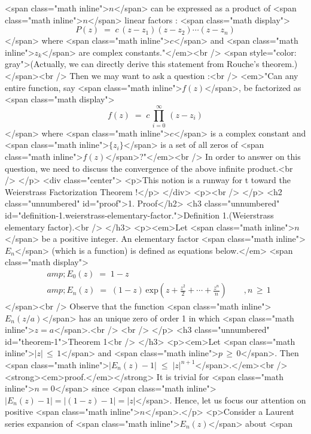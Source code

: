 <span class="math inline">\(n\)</span> can be expressed as a product of
<span class="math inline">\(n\)</span> linear factors : <span
class="math display">\[P(z) \;=\; c\, (z-z_1)(z-z_2)\cdots
(z-z_n)\]</span> where <span class="math inline">\(c\)</span> and <span
class="math inline">\(z_k\)</span> are complex constants."</em><br />
<span style="color: gray">(Actually, we can directly derive this
statement from Rouche’s theorem.)</span><br />
Then we may want to ask a question :<br />
<em>"Can any entire function, say <span
class="math inline">\(f(z)\)</span>, be factorized as <span
class="math display">\[f(z) \;=\; c\,\prod_{i=0}^{\infty} \,
(z-z_i)\]</span> where <span class="math inline">\(c\)</span> is a
complex constant and <span class="math inline">\(\{z_i\}\)</span> is a
set of all zeros of <span
class="math inline">\(f(z)\)</span>?"</em><br />
In order to answer on this question, we need to discuss the convergence
of the above infinite product.<br />
</p>
<div class="center">
<p>This notion is a runway for t toward the Weierstrass Factorization
Theorem !</p>
</div>
<p><br />
</p>
<h2 class="unnumbered" id="proof">1. Proof</h2>
<h3 class="unnumbered"
id="definition-1.weierstrass-elementary-factor.">Definition
1.(Weierstrass elementary factor).<br />
</h3>
<p><em>Let <span class="math inline">\(n\)</span> be a positive integer.
An elementary factor <span class="math inline">\(E_n\)</span> (which is
a function) is defined as equations below.</em> <span
class="math display">\[\begin{aligned}
&amp;E_0 (z) \;=\; 1-z \\
&amp;E_n (z) \;=\; (1-z) \, \mathrm{exp}\left(z + \frac{z^2}{2} + \cdots
+ \frac{z^n}{n} \right) \qquad , n \,\ge\, 1
\end{aligned}\]</span><br />
Observe that the function <span class="math inline">\(E_n (z/a)\)</span>
has an unique zero of order 1 in which <span
class="math inline">\(z=a\)</span>.<br />
<br />
</p>
<h3 class="unnumbered" id="theorem-1">Theorem 1<br />
</h3>
<p><em>Let <span class="math inline">\(|z| \, \le \, 1\)</span> and
<span class="math inline">\(p \,\ge\, 0\)</span>. Then <span
class="math inline">\(| E_n (z) - 1 | \; \le \;
|z|^{n+1}\)</span>.</em><br />
<strong><em>proof.</em></strong> It is trivial for <span
class="math inline">\(n=0\)</span> since <span class="math inline">\(|
E_n(z) - 1 | = | (1-z)-1 | = |z|\)</span>. Hence, let us focus our
attention on positive <span class="math inline">\(n\)</span>.</p>
<p>Consider a Laurent series expansion of <span
class="math inline">\(E_n (z)\)</span> about <span
